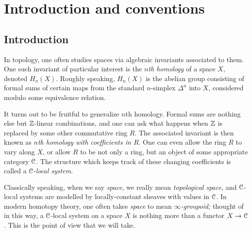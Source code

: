 \documentclass[main.tex]{subfiles}
\begin{document}
\section{Introduction and conventions}
\label{sec:introduction_and_conventions}

\subsection{Introduction}
\label{ssc:introduction}

In topology, one often studies spaces via algebraic invariants associated to them. One such invariant of particular interest is the \emph{$n$th homology} of a space $X$, denoted $H_{n}(X)$. Roughly speaking, $H_{n}(X)$ is the abelian group consisting of formal sums of certain maps from the standard $n$-simplex $\Delta^{n}$ into $X$, considered modulo some equivalence relation.

It turns out to be fruitful to generalize $n$th homology. Formal sums are nothing else but $\mathbb{Z}$-linear combinations, and one can ask what happens when $\mathbb{Z}$ is replaced by some other commutative ring $R$. The associated invariant is then known as \emph{$n$th homology with coefficients in $R$}. One can even allow the ring $R$ to vary along $X$, or allow $R$ to be not only a ring, but an object of some appropriate category $\mathcal{C}$. The structure which keeps track of these changing coefficients is called a $\mathcal{C}$-\emph{local system}. 

Classically speaking, when we say \emph{space,} we really mean \emph{topological space,} and $\mathcal{C}$-local systems are modelled by locally-constant sheaves with values in $\mathcal{C}$. In modern homotopy theory, one often takes \emph{space} to mean \emph{$\infty$-groupoid;} thought of in this way, a $\mathcal{C}$-local system on a space $X$ is nothing more than a functor $X \to \mathcal{C}$. This is the point of view that we will take.
\end{document}

